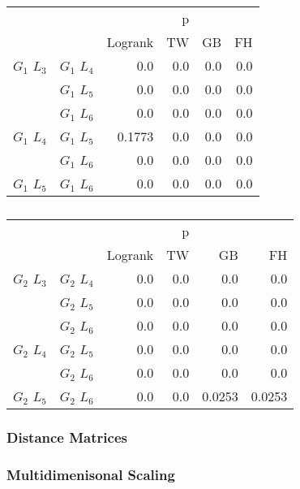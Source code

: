       \begin{table}
        \centering
        \begin{tabular}{llrrrr}
          \toprule
                       &             &         &  p &    &     \\
          \cmidrule{3-6}
                       &             & Logrank & TW & GB & FH  \\
          \midrule
          $G_1$ $L_3$  & $G_1$ $L_4$  &  0.0 &  0.0 &  0.0 &  0.0     \\
                       & $G_1$ $L_5$  & 0.0 & 0.0 & 0.0 & 0.0    \\
                       & $G_1$ $L_6$  & 0.0 & 0.0 & 0.0 & 0.0      \\
          $G_1$ $L_4$  & $G_1$ $L_5$  & 0.1773 & 0.0 & 0.0 & 0.0      \\
                       & $G_1$ $L_6$  & 0.0 & 0.0 & 0.0 & 0.0       \\
          $G_1$ $L_5$   & $G_1$ $L_6$ & 0.0 &  0.0 & 0.0 & 0.0      \\
          \bottomrule
        \end{tabular}
        \label{tab:g1_ingroup_tests_radius}
        \caption{}
      \end{table}


      \begin{table}
        \centering
        \begin{tabular}{llrrrr}
          \toprule
                       &             &         &  p &    &     \\
          \cmidrule{3-6}
                       &             & Logrank & TW & GB & FH  \\
          \midrule
          $G_2$ $L_3$  & $G_2$ $L_4$  &  0.0 &  0.0 &  0.0 &  0.0     \\
                       & $G_2$ $L_5$  & 0.0 & 0.0 & 0.0 & 0.0    \\
                       & $G_2$ $L_6$  & 0.0 & 0.0 & 0.0 & 0.0      \\
          $G_2$ $L_4$  & $G_2$ $L_5$  & 0.0 & 0.0 & 0.0 & 0.0      \\
                       & $G_2$ $L_6$  & 0.0 & 0.0 & 0.0 & 0.0       \\
          $G_2$ $L_5$   & $G_2$ $L_6$ & 0.0 & 0.0 & 0.0253 & 0.0253      \\
          \bottomrule
        \end{tabular}
        \label{tab:g2_ingroup_tests_radius}
        \caption{}
      \end{table}


      \subsubsection{Distance Matrices}


      \subsubsection{Multidimenisonal Scaling}


















